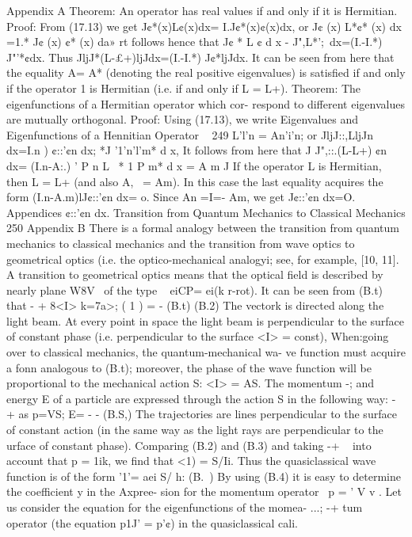 \documentclass[a4paper,sfsidenotes,colorlinks=true]{tufte-book}
\numberwithin{equation}{section}
\numberwithin{figure}{section}
\begin{document}
{{{{{{Appendix A Theorem: An operator has real values if and only if it is Hermitian.
Proof: From (17.13) we get
J¢*(x)L¢(x)dx= I.J¢*(x)¢(x)dx, or
J¢ (x) L*¢* (x) dx =1.* J¢ (x) ¢* (x) da» rt follows hence that
J¢ * L ¢ d x - J",L*';~dx=(I.-I.*) J"'*¢dx.
Thus JljJ*(L-£+)ljJdx=(I.-I.*) J¢*ljJdx.
It can be seen from here that the equality A= A* (denoting the real positive eigenvalues) is satisfied if and only if the operator 1
is Hermitian (i.e. if and only if L = L+). Theorem: The eigenfunctions of a Hermitian operator which cor-
respond to different eigenvalues are mutually orthogonal. Proof: Using (17.13), we write
Eigenvalues and Eigenfunctions of a Hennitian Operator
~ 249
L'l'n =	An'i'n; or
JljJ::,LljJn dx=I.n ) ¢::'¢n dx;
*J '1'n'l'm* d x, It follows from here that
J J",::.(L-L+) ¢n dx= (I.n-A:.)
' P n L ~* 1 P m* d x = A m
J
If the operator L is Hermitian, then L = L+ (and also A,~ = Am). In this case the last equality acquires the form
(I.n-A.m)lJ¢::'¢n dx= o. Since An =I=- Am, we get
J¢::'¢n dx=O. Appendices
¢::'¢n dx.
Transition from Quantum
Mechanics to Classical Mechanics
250
Appendix B
There is a formal analogy between the transition from quantum mechanics to classical mechanics and the transition from wave optics to geometrical optics (i.e. the optico-mechanical analogyi; see, for example, [10, 11]. A transition to geometrical optics means that the optical field is described by nearly plane W8V~
of the type
~
eiCP= ei(k r-rot).
It can be seen from (B.t) that
- +	8<I> k=7a>;	( 1 ) = -
(B.t) (B.2)
The vectork is directed along the light beam. At every point in space the light beam is perpendicular to the surface of constant phase (i.e. perpendicular to the surface <I> = const), When:going over to classical mechanics, the quantum-mechanical wa- ve function must acquire a fonn analogous to (B.t); moreover, the phase of the wave function will be proportional to the mechanical action S:
<I> = AS. The momentum -; and energy E of a particle are expressed through
the action S in the following way:
- +	as p=VS;	E= - -
(B.S,)
The trajectories are lines perpendicular to the surface of constant
action (in the same way as the light rays are perpendicular to the
urface of constant phase). Comparing (B.2) and (B.3) and taking
-+ ~ into account that p = 1ik, we find that
<1) = S/Ii. Thus the quasiclassical wave function is of the form
'1'= aei S/ h:	(B.~) By using (B.4) it is easy to determine the coefficient y in the Axpree-
sion for the momentum operator
~p = ' V v . Let us consider the equation for the eigenfunctions of the momea-
...;	-+ tum operator (the equation p1J' = p'¢) in the quasiclassical cali.
}}}}}}
\end{document}
